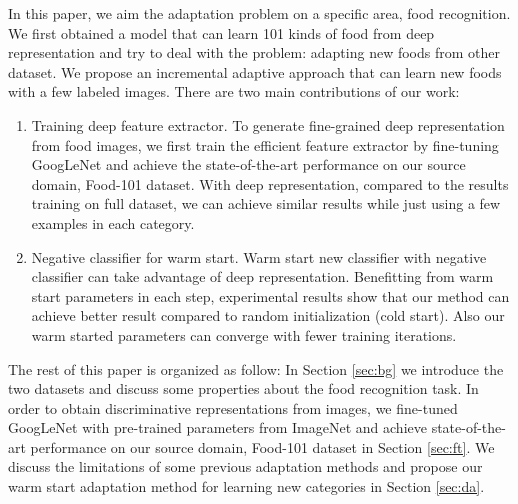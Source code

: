 In this paper, we aim the adaptation problem on a specific area, food recognition. We first obtained a model that can learn 101 kinds of food from deep representation and try to deal with the problem: adapting new foods from other dataset. We propose an incremental adaptive approach that can learn new foods with a few labeled images. There are two main contributions of our work:
\begin{enumerate}
  \item Training deep feature extractor. To generate fine-grained deep representation from food images, we first train the efficient feature extractor by fine-tuning GoogLeNet and achieve the state-of-the-art performance on our source domain, Food-101 dataset. With deep representation, compared to the results training on full dataset, we can achieve similar results while just using a few examples in each category.
  \item Negative classifier for warm start. Warm start new classifier with negative classifier can take advantage of deep representation. Benefitting from warm start parameters in each step, experimental results show that our method can achieve better result compared to random initialization (cold start). Also our warm started parameters can converge with fewer training iterations.
\end{enumerate}

The rest of this paper is organized as follow: In Section \ref{sec:bg} we introduce the two datasets and discuss some properties about the food recognition task. In order to obtain discriminative representations from images, we fine-tuned GoogLeNet with pre-trained parameters from ImageNet and achieve state-of-the-art performance on our source domain, Food-101 dataset in Section \ref{sec:ft}. We discuss the limitations of some previous adaptation methods and propose our warm start adaptation method for learning new categories in Section \ref{sec:da}.
